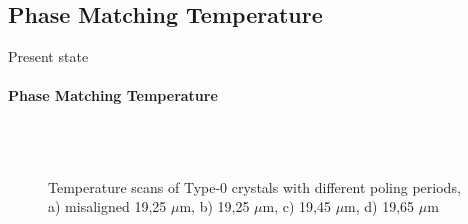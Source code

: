 \documentclass[serif,8pt]{beamer}
\begin{document}
\subsection{Phase Matching Temperature}
\begin{frame}{Present state}
	\framesubtitle{Phase Matching Temperature}
	\begin{figure}[!ht]
	  \centering
	  \caption{Temperature scans of Type-0 crystals with different poling periods, a) misaligned 19,25 $\mu$m, b) 19,25 $\mu$m, c) 19,45 $\mu$m, d) 19,65 $\mu$m}
	  \quad
	  \\
	  \quad
	  \\
	  \label{fig:gratings}
	\end{figure}
\end{frame}
\end{document}
